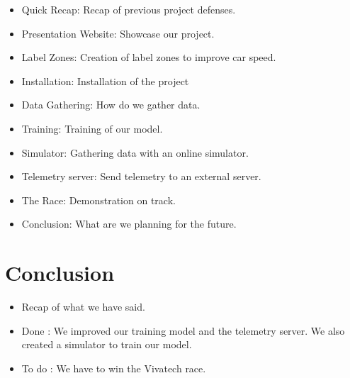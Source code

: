 \documentclass[11pt]{article}
\begin{document}
\begin{itemize}
 
\item Quick Recap: Recap of previous project defenses.
\item Presentation Website: Showcase our project. 
\item Label Zones: Creation of label zones to improve car speed. 
\item Installation: Installation of the project
\item Data Gathering: How do we gather data. 
\item Training: Training of our model.
\item Simulator: Gathering data with an online simulator.
\item Telemetry server: Send telemetry to an external server.
\item The Race: Demonstration on track.
\item Conclusion: What are we planning for the future.

\end{itemize}

\section {Conclusion}

\begin{itemize}
\item Recap of what we have said.
\item Done : We improved our training model and the telemetry server. We also created a simulator to train our model. 

\item To do : We have to win the Vivatech race.

\end{itemize}
\end{document}
